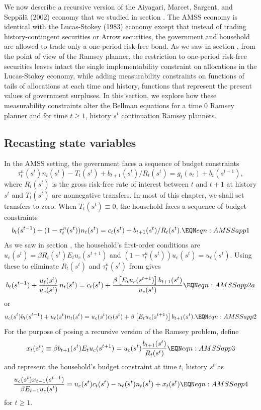 We now describe a recursive version of  the Aiyagari, Marcet, Sargent, and Sepp\"al\"a (2002)
economy %
that we studied in section .
%
%
The AMSS economy is identical with the Lucas-Stokey (1983) economy except that instead of trading history-contingent securities or Arrow securities,
the government and household are allowed to trade only a one-period risk-free bond. As we saw in section , from the point of view
of the Ramsey planner, the restriction to one-period risk-free securities leaves intact the single implementability constraint on allocations in the
Lucas-Stokey economy, while adding  measurability constraints on functions of tails of  allocations at each
time and history, functions that represent the present values of government surpluses. In this section, we explore how these
measurability  constraints alter the Bellman equations for a time $0$ Ramsey planner and for time $t \geq 1$, history $s^t$ continuation Ramsey planners.


\subsection{Recasting state variables}

In the AMSS setting, the government  faces a sequence of  budget constraints
$$   \tau_t^n(s^t) n_t(s^t) - T_t(s^t) +  b_{t+1}(s^t)/ R_t (s^t) 
=  g_t(s_t) + b_t(s^{t-1})  ,$$
where $R_t(s^t)$ is the gross risk-free rate of interest between $t$ and $t+1$ at history $s^t$ and $T_t(s^t)$ are nonnegative transfers.
In most of this chapter, we shall set transfers   to zero.
When $T_t(s^t) \equiv 0$,
the household faces a sequence of budget constraints
$$ b_t(s^{t-1}) + (1-\tau^n_t(s^t)) n_t(s^t) = c_t(s^t) + b_{t+1}(s^t)/R_t(s^t)  .  \EQN eqn:AMSSapp1  $$
As we saw in section ,  the household's first-order conditions are
$u_{c}(s^t) = \beta R_t(s^t) E_t u_{c}(s^{t+1})$ and $(1-\tau_t^n(s^t)) u_{c}(s^t) = u_{\ell}(s^t)$.  Using these to eliminate
$R_t(s^t)$ and $\tau_t^n(s^t)$ from  gives
$$ b_t(s^{t-1}) + { \frac{u_{\ell}(s^t)}{u_{c}(s^t)}}\, n_t(s^t) = c_t(s^t) + {\frac{\beta \left[E_t u_{c}(s^{t+1})\right] b_{t+1}(s^t)}{u_{c}(s^t)}}
  \EQN eqn:AMSSapp2a $$
or
$$ u_{c}(s^t) b_t(s^{t-1}) + u_{\ell}(s^t) n_t(s^t) = u_{c}(s^t) c_t(s^t) + \beta \left[E_t u_{c}(s^{t+1})\right] b_{t+1}(s^t) . \EQN eqn:AMSSapp2 $$
For the purpose of posing a recursive version of the Ramsey problem, define
$$ x_t(s^t) \equiv \beta b_{t+1}(s^t) E_t u_{c}(s^{t+1}) = u_{c} (s^t) {\frac{b_{t+1}(s^t)}{R_t(s^t)}} \EQN eqn:AMSSapp3 $$
and represent the household's budget constraint  at time $t$, history $s^t$  as
$$ {\frac{u_{c}(s^t) x_{t-1}(s^{t-1})}{\beta E_{t-1} u_{c}(s^t)}} = u_{c}(s^t) c_t(s^t) - u_{\ell}(s^t) n_t(s^t) + x_t(s^t)   \EQN eqn:AMSSapp4 $$
for $t \geq 1$.

